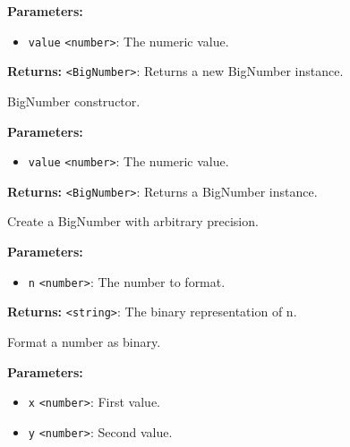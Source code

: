 \documentclass[12pt,a4paper]{article}
\begin{document}
\vspace{5mm}
\noindent {}


\noindent \textbf{Parameters:}
\begin{itemize}
  \item \texttt{value} \texttt{<number>}: The numeric value.
\end{itemize}

\noindent \textbf{Returns:} \texttt{<BigNumber>}: Returns a new BigNumber instance.

\noindent BigNumber constructor.

\vspace{5mm}
\noindent {}


\noindent \textbf{Parameters:}
\begin{itemize}
  \item \texttt{value} \texttt{<number>}: The numeric value.
\end{itemize}

\noindent \textbf{Returns:} \texttt{<BigNumber>}: Returns a BigNumber instance.

\noindent Create a BigNumber with arbitrary precision.

\vspace{5mm}
\noindent {}


\noindent \textbf{Parameters:}
\begin{itemize}
  \item \texttt{n} \texttt{<number>}: The number to format.
\end{itemize}

\noindent \textbf{Returns:} \texttt{<string>}: The binary representation of \textasciigrave{}n\textasciigrave{}.

\noindent Format a number as binary.

\vspace{5mm}
\noindent {}


\noindent \textbf{Parameters:}
\begin{itemize}
  \item \texttt{x} \texttt{<number>}: First value.
  \item \texttt{y} \texttt{<number>}: Second value.
\end{itemize}
\end{document}
